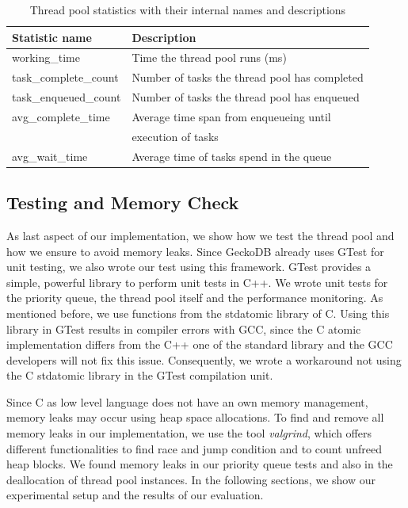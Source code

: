 \documentclass[conference]{IEEEtran}
\begin{document}
\begin{table}[htbp]
	\caption{Thread pool statistics with their internal names and descriptions}
	\begin{center}
		\begin{tabular}{ l l }
			\hline
			\textbf{Statistic name}&\textbf{Description}\\
			\hline
			working\_time & Time the thread pool runs (ms) \\
			task\_complete\_count & Number of tasks the thread pool has completed\\
			task\_enqueued\_count & Number of tasks the thread pool has enqueued \\
			avg\_complete\_time & Average time span from enqueueing until \\
			& execution of tasks \\
			avg\_wait\_time & Average time of tasks spend in the queue \\
			\hline
		\end{tabular}
		\label{tab4}
	\end{center}
\end{table}

\subsection{Testing and Memory Check}
As last aspect of our implementation, we show how we test the thread pool and how we ensure to avoid memory leaks. Since GeckoDB already uses GTest \cite{sen2010quick} for unit testing, we also wrote our test using this framework. GTest provides a simple, powerful library to perform unit tests in C++. We wrote unit tests for the priority queue, the thread pool itself and the performance monitoring. As mentioned before, we use functions from the stdatomic library of C. Using this library in GTest results in compiler errors with GCC, since the C atomic implementation differs from the C++ one of the standard library and the GCC developers will not fix this issue. Consequently, we wrote a workaround not using the C stdatomic library in the GTest compilation unit.

Since C as low level language does not have an own memory management, memory leaks may occur using heap space allocations. To find and remove all memory leaks in our implementation, we use the tool \emph{valgrind}, which offers different functionalities to find race and jump condition and to count unfreed heap blocks. We found memory leaks in our priority queue tests and also in the deallocation of thread pool instances. In the following sections, we show our experimental setup and the results of our evaluation.
\end{document}

